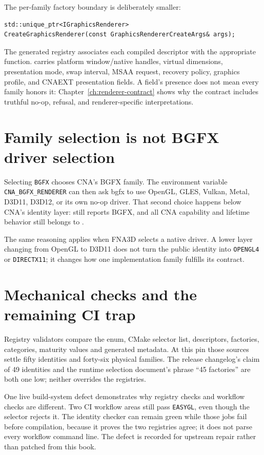 The per-family factory boundary is deliberately smaller:

\begin{lstlisting}
std::unique_ptr<IGraphicsRenderer>
CreateGraphicsRenderer(const GraphicsRendererCreateArgs& args);
\end{lstlisting}

The generated registry associates each compiled descriptor with the appropriate function.
 carries
platform window/native handles, virtual dimensions, presentation mode, swap interval, MSAA
request, recovery policy, graphics profile, and CNAEXT presentation fields. A field's presence does not mean every
family honors it: Chapter~\ref{ch:renderer-contract} shows why the contract includes truthful
no-op, refusal, and renderer-specific interpretations.

\section{Family selection is not BGFX driver selection}

Selecting \texttt{BGFX} chooses CNA's BGFX family. The environment variable
\texttt{CNA\_BGFX\_RENDERER} can then ask bgfx to use OpenGL, GLES, Vulkan, Metal, D3D11, D3D12,
or its own no-op driver. That second choice happens below CNA's identity layer:
 still reports BGFX, and all CNA capability and lifetime
behavior still belongs to .

The same reasoning applies when FNA3D selects a native driver. A lower layer changing from
OpenGL to D3D11 does not turn the public identity into \texttt{OPENGL4} or
\texttt{DIRECTX11}; it changes how one implementation family fulfills its contract.

\section{Mechanical checks and the remaining CI trap}

Registry validators compare the enum, CMake selector list, descriptors, factories, categories,
maturity values and generated metadata. At this pin those sources settle fifty identities and
forty-six physical families. The release changelog's claim of 49 identities and the runtime
selection document's phrase ``45 factories'' are both one low; neither overrides the registries.

One live build-system defect demonstrates why registry checks and workflow checks are different.
Two CI workflow areas still pass \texttt{EASYGL}, even though the selector rejects it. The
identity checker can remain green while those jobs fail before compilation, because it proves
the two registries agree; it does not parse every workflow command line. The defect is recorded
for upstream repair rather than patched from this book.

